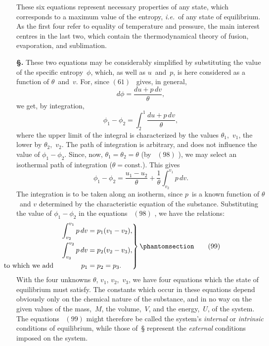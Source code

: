 \documentclass[12pt]{book}[2005/09/16]
\newcommand{\Typo}[2]{#2}
\newcommand{\Chg}[2]{#2}
\newcommand{\Add}[1]{\Chg{}{#1}}
\newcommand{\Section}[1]{
  \medskip\par\textbf{§\;#1}
  \label{section:#1}
}
\newcommand{\SecRef}[2][§\;]{\hyperref[section:#2.]{{\upshape #1#2}}}
\newcommand{\Tag}[1]{%
  \phantomsection\label{eqn:#1}\tag*{\ensuremath{#1}}%
}
\newcommand{\Eq}[1]{%
  \hyperref[eqn:#1]{\ensuremath{#1}}%
}
\newcommand{\PageSep}[1]{\ignorespaces}
\newcommand{\const}{\text{const.}}
\newcommand{\ie}{\emph{i.e.}}
\begin{document}
These six equations represent necessary properties of any
state, which corresponds to a maximum value of the entropy,
\ie\ of any state of equilibrium. As the first four refer to
equality of temperature and pressure, the main interest
centres in the last two, which contain the thermodynamical
theory of fusion, evaporation, and sublimation.
%

\Section{168.} These two equations may be considerably simplified
%
%
%
%
by substituting the value of the specific entropy~$\phi$,
which, as well as $u$~and~$p$, is here considered as a function of
$\theta$~and~$v$. For, since \Eq{(61)}~gives, in general,
\[
d\phi = \frac{du + p\, dv}{\theta},
\]
we get, by integration,
\[
\phi_{1} - \phi_{2} = \int_{2}^{1} \frac{du + p\, dv}{\theta},
\]
where the upper limit of the integral is characterized by the
values $\theta_{1}$,~$v_{1}$, the lower by $\theta_{2}$,~$v_{2}$. The path of integration
is arbitrary, and does not influence the value of $\phi_{1} - \phi_{2}$.
Since, now, $\theta_{1} = \theta_{2} = \theta$ (by~\Typo{98}{\Eq{(98)}}), we may select an isothermal
path of integration ($\theta = \const$). This gives
\[
\phi_{1} - \phi_{2} = \frac{u_{1} - u_{2}}{\theta} + \frac{1}{\theta} \int_{v_{2}}^{v_{1}} p\, dv.
\]
\PageSep{136}
The integration is to be taken along an isotherm, since $p$~is
a known function of $\theta$~and $v$ determined by the characteristic
equation of the substance. Substituting the value
of $\phi_{1} - \phi_{2}$ in the equations~\Eq{(98)}, we have the relations:
\[
\left.
\begin{aligned}
\int_{v_{2}}^{v_{1}} p\, dv &= p_{1}(v_{1} - v_{2})\Add{,} \\
\int_{v_{3}}^{v_{2}} p\, dv &= p_{2}(v_{2} - v_{3})\Add{,} \\
\llap{\text{to which we add}\qquad\qquad}
p_{1} &= p_{2} = p_{3}\Add{.}
\end{aligned}
\right\}
\Tag{(99)}
\]
With the four unknowns $\theta$, $v_{1}$, $v_{2}$,~$v_{3}$, we have four equations
which the state of equilibrium must satisfy. The constants
%
which occur in these equations depend obviously only on
the chemical nature of the substance, and in no way on the
given values of the mass,~$M$, the volume,~$V$, and the energy,~$U$,
of the system. The equations~\Eq{(99)} might therefore be
called the system's \emph{internal} or \emph{intrinsic} conditions of equilibrium,
while those of~\SecRef{166} represent the \emph{external} conditions
imposed on the system.
\end{document}
